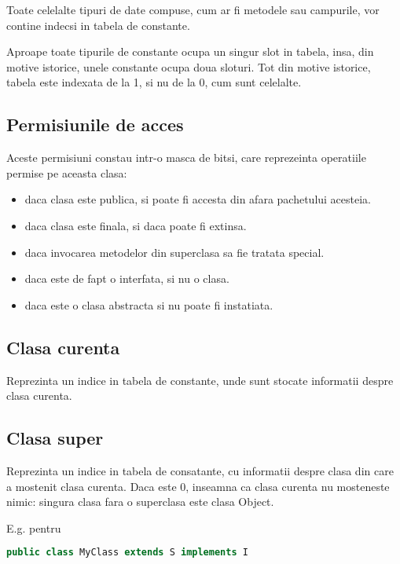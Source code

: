 Toate celelalte tipuri de date compuse, cum ar fi metodele sau
campurile, vor contine indecsi in tabela de constante.

Aproape toate tipurile de constante ocupa un singur slot in tabela, insa, din
motive istorice, unele constante ocupa doua sloturi.
Tot din motive istorice, tabela este indexata de la 1, si nu
de la 0, cum sunt celelalte.

\subsection{Permisiunile de acces}

Aceste permisiuni constau intr-o masca de bitsi, care reprezeinta
operatiile permise pe aceasta clasa:

\begin{itemize}
    \item daca clasa este publica, si poate fi accesta din afara pachetului acesteia.
    \item daca clasa este finala, si daca poate fi extinsa.
    \item daca invocarea metodelor din superclasa sa fie tratata special.
    \item daca este de fapt o interfata, si nu o clasa.
    \item daca este o clasa abstracta si nu poate fi instatiata.
\end{itemize}

\subsection{Clasa curenta}

Reprezinta un indice in tabela de constante, unde sunt stocate
informatii despre clasa curenta.

\subsection{Clasa super}

Reprezinta un indice in tabela de consatante, cu informatii despre clasa
din care a mostenit clasa curenta. Daca este 0, inseamna ca clasa
curenta nu mosteneste nimic: singura clasa fara o superclasa este clasa
Object.

E.g. pentru

\begin{lstlisting}[language=Java]
public class MyClass extends S implements I
\end{lstlisting}

